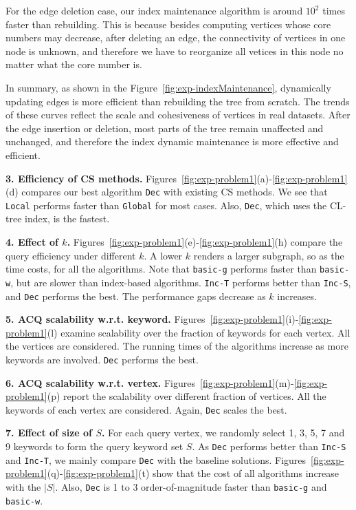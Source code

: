 {For the edge deletion case, our index maintenance algorithm is around $10^2$ times faster than rebuilding. This is because besides computing vertices whose core numbers may decrease, after deleting an edge, the connectivity of vertices in one node is unknown, and therefore we have to reorganize all vetices in this node no matter what the core number is. 

In summary, as shown in the Figure~\ref{fig:exp-indexMaintenance}, dynamically updating edges is more efficient than rebuilding the tree from scratch. The trends of these curves reflect the scale and cohesiveness of vertices in real datasets. After the edge insertion or deletion, most parts of the tree remain unaffected and unchanged, and therefore the index dynamic maintenance is more effective and efficient.

}

\textbf{3. Efficiency of CS methods.}
Figures~\ref{fig:exp-problem1}(a)-\ref{fig:exp-problem1}(d) compares our best algorithm {\tt Dec} with existing CS methods. We see that {\tt Local} performs faster than {\tt Global} for most cases. Also, {\tt Dec}, which uses the CL-tree index, is the fastest.

\textbf{4. Effect of $k$.}
Figures~\ref{fig:exp-problem1}(e)-\ref{fig:exp-problem1}(h)
compare the query efficiency under different $k$.
A lower $k$ renders a larger subgraph, so as the time costs, for all the algorithms.
Note that {\tt basic-g} performs faster than {\tt basic-w}, but are slower than index-based algorithms.
{\tt Inc-T} performs better than {\tt Inc-S}, and {\tt Dec} performs the best.
The performance gaps decrease as $k$ increases.

\textbf{5. ACQ scalability w.r.t. keyword.}
Figures~\ref{fig:exp-problem1}(i)-\ref{fig:exp-problem1}(l) examine scalability over the fraction of keywords for each vertex. All the vertices are considered. The running times of the algorithms increase as more keywords are involved. {\tt Dec} performs the best.

\textbf{6. ACQ scalability w.r.t. vertex.}
Figures~\ref{fig:exp-problem1}(m)-\ref{fig:exp-problem1}(p) report the scalability over different fraction of vertices.
All the keywords of each vertex are considered. Again, {\tt Dec} scales the best.

\textbf{7. Effect of size of $S$.}
For each query vertex, we randomly select 1, 3, 5, 7 and 9 keywords to form the query keyword set $S$.
As {\tt Dec} performs better than {\tt Inc-S} and {\tt Inc-T}, we mainly compare {\tt Dec} with the baseline solutions. Figures~\ref{fig:exp-problem1}(q)-\ref{fig:exp-problem1}(t) show that the cost of all algorithms increase with the $|S|$. Also, {\tt Dec} is 1 to 3 order-of-magnitude faster than {\tt basic-g} and {\tt basic-w}.

